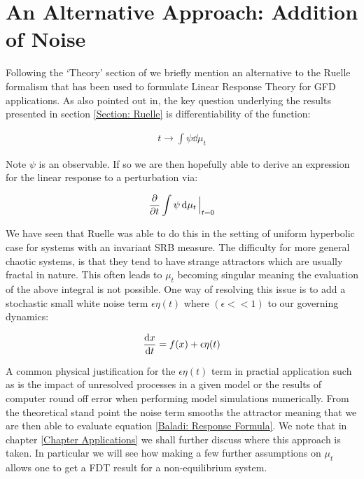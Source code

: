 \section{An Alternative Approach: Addition of Noise} \label{Ruelle Alternatives}

Following the `Theory' section of \cite{Gritsun2007} we briefly mention an alternative to the Ruelle formalism that has been used to formulate Linear Response Theory for GFD applications. As also pointed out in\cite{Baladi2014}, the key question underlying the results presented in section \ref{Section: Ruelle} is differentiability of the function: 

\begin{align}
t \to \int \psi \dd{\mu_t}
\end{align}

\noindent Note $\psi$ is an observable. If so we are then hopefully able to derive an expression for the linear response to a perturbation via:

\begin{align} \label{Baladi: Response Formula}
\pdv{t} \int \psi \dd{\mu_t} \Big|_{t=0} 
\end{align}

\noindent We have seen that Ruelle was able to do this in the setting of uniform hyperbolic case for systems with an invariant SRB measure. The difficulty for more general chaotic systems, is that they tend to have strange attractors which are usually fractal in nature. This often leads to $\mu_t$ becoming singular meaning the evaluation of the above integral is not possible. One way of resolving this issue is to add a stochastic small white noise term $\epsilon \eta(t)$ where $(\epsilon << 1)$ to our governing dynamics:

\begin{align}
\dv{x}{t} = f(x) + \epsilon \eta(t) \label{Noise dynamics}
\end{align}

\noindent A common physical justification for the $\epsilon \eta(t)$ term in practial application such as \cite{Gritsun2007} is the impact of unresolved processes in a given model or the results of computer round off error when performing model simulations numerically. From the theoretical stand point the noise term smooths the attractor meaning that we are then able to evaluate equation \ref{Baladi: Response Formula}. We note that in chapter \ref{Chapter Applications} we shall further discuss \cite{Gritsun2007} where this approach is taken. In particular we will see how making a few further assumptions on $\mu_t$ allows one to get a FDT result for a non-equilibrium system.